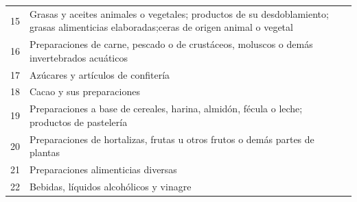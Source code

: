\documentclass[a4paper,openright,12pt]{book}
\begin{document}
\begin{table}[]
{\begin{tabular}{@{}ll@{}}
15  & Grasas y aceites animales o vegetales; productos de su desdoblamiento; grasas alimenticias elaboradas;ceras de origen animal o vegetal                                                                                                                                                         \\
16  & Preparaciones de carne, pescado o de crustáceos, moluscos o demás invertebrados acuáticos                                                                                                                                                                                                      \\
17  & Azúcares y artículos de confitería                                                                                                                                                                                                                                                             \\
18  & Cacao y sus preparaciones                                                                                                                                                                                                                                                                      \\
19  & Preparaciones a base de cereales, harina, almidón, fécula o leche; productos de pastelería                                                                                                                                                                                                     \\
20  & Preparaciones de hortalizas, frutas u otros frutos o demás partes de plantas                                                                                                                                                                                                                   \\
21  & Preparaciones alimenticias diversas                                                                                                                                                                                                                                                            \\
22  & Bebidas, líquidos alcohólicos y vinagre                                                                                                                                                                                                                                                        \\

\end{tabular}}
\end{table}
\end{document}
